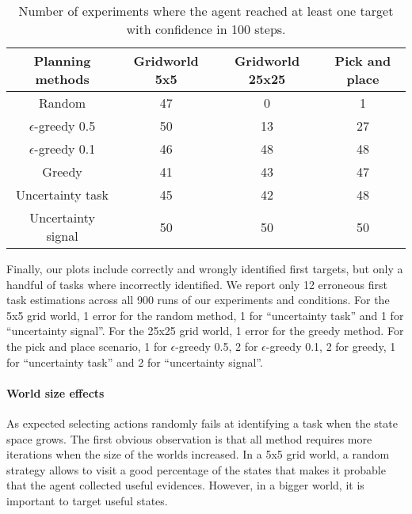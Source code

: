 \begin{table}[!htbp]
\centering
{}
\begin{tabular}{c c c c}
    Planning methods & Gridworld 5x5 & Gridworld 25x25 &  Pick and place \\ \hline
    Random & 47 & 0 & 1 \\ 
    $\epsilon$-greedy 0.5 & 50 & 13 & 27 \\
    $\epsilon$-greedy 0.1 & 46 & 48 & 48 \\
    Greedy & 41 & 43 & 47 \\
    Uncertainty task & 45 & 42 & 48 \\
    Uncertainty signal & 50 & 50 & 50 \\
\end{tabular}
\caption{Number of experiments where the agent reached at least one target with confidence in 100 steps.}
\label{tab:wordlpropertiesnreach}
\end{table}

Finally, our plots include correctly and wrongly identified first targets, but only a handful of tasks where incorrectly identified. We report only 12 erroneous first task estimations across all 900 runs of our experiments and conditions. For the 5x5 grid world, 1 error for the random method, 1 for ``uncertainty task'' and 1 for ``uncertainty signal''. For the 25x25 grid world, 1 error for the greedy method. For the pick and place scenario, 1 for $\epsilon$-greedy 0.5, 2 for $\epsilon$-greedy 0.1, 2 for greedy, 1 for ``uncertainty task'' and 2 for ``uncertainty signal''.

\paragraph{World size effects}

As expected selecting actions randomly fails at identifying a task when the state space grows. The first obvious observation is that all method requires more iterations when the size of the worlds increased. In a 5x5 grid world, a random strategy allows to visit a good percentage of the states that makes it probable that the agent collected useful evidences. However, in a bigger world, it is important to target useful states. 


